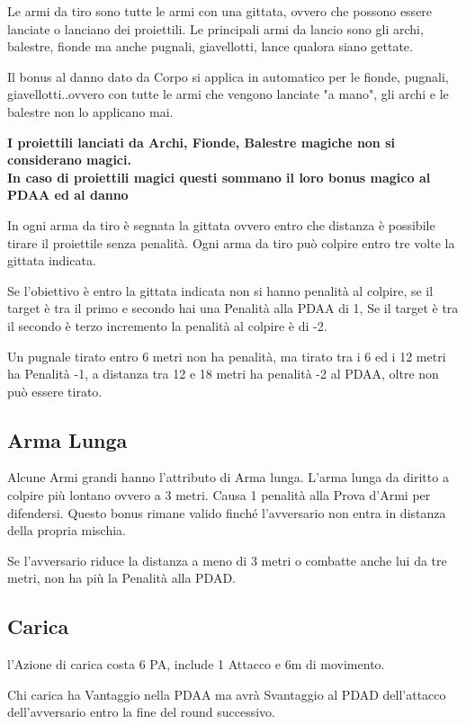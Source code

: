 \documentclass[12pt,a4paper,twoside,openany]{book}
\begin{document}
\begin{multicols}{2}
Le armi da tiro sono tutte le armi con una gittata, ovvero che possono essere lanciate o lanciano dei proiettili. Le principali armi da lancio sono gli archi, balestre, fionde ma anche pugnali, giavellotti, lance qualora siano gettate.

Il bonus al danno dato da Corpo si applica in automatico per le fionde, pugnali, giavellotti..ovvero con tutte le armi che vengono lanciate "a mano", gli archi e le balestre non lo applicano mai.

\textbf{I proiettili lanciati da Archi, Fionde, Balestre magiche non si considerano magici.\\
In caso di proiettili magici questi sommano il loro bonus magico al PDAA ed al danno}

In ogni arma da tiro è segnata la gittata ovvero entro che distanza è possibile tirare il proiettile senza penalità. Ogni arma da tiro può colpire entro tre volte la gittata indicata.

Se l'obiettivo è entro la gittata indicata non si hanno penalità al colpire, se il target è tra il primo e secondo hai una Penalità alla PDAA di 1, Se il target è tra il secondo è terzo incremento la penalità al colpire è di -2.

Un pugnale tirato entro 6 metri non ha penalità, ma tirato tra i 6 ed i 12 metri ha Penalità -1, a distanza tra 12 e 18 metri ha penalità -2 al PDAA, oltre non può essere tirato.

\subsection{Arma Lunga} \label{armalunga}

Alcune Armi grandi hanno l'attributo di Arma lunga. L'arma lunga da diritto a colpire più lontano ovvero a 3 metri. Causa 1 penalità alla Prova d'Armi per difendersi. Questo bonus rimane valido finché l'avversario non entra in distanza della propria mischia.

Se l'avversario riduce la distanza a meno di 3 metri o combatte anche lui da tre metri, non ha più la Penalità alla PDAD.

\subsection{Carica} \label{carica}

l'Azione di carica costa 6 PA, include 1 Attacco e 6m di movimento.

Chi carica ha Vantaggio nella PDAA ma avrà Svantaggio al PDAD dell'attacco dell'avversario entro la fine del round successivo.


\end{multicols}
\end{document}
